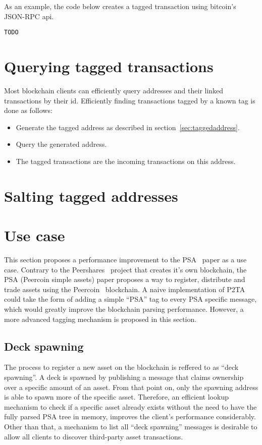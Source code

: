 \documentclass[a4paper,10pt]{article}
\begin{document}
As an example, the code below creates a tagged transaction using bitcoin's JSON-RPC api.
\begin{verbatim}
TODO
\end{verbatim}


\section{Querying tagged transactions}
Most blockchain clients can efficiently query addresses and their linked transactions by their id.
Efficiently finding transactions tagged by a known tag is done as follows:
\begin{itemize}
 \item Generate the tagged address as described in section~\ref{sec:taggedaddress}.
 \item Query the generated address.
 \item The tagged transactions are the incoming transactions on this address.
\end{itemize}


\section{Salting tagged addresses}


\section{Use case}
This section proposes a performance improvement to the PSA~\cite{Pchem} paper as a use case.
Contrary to the Peershares~\cite{TODO} project that creates it's own blockchain, the PSA (Peercoin simple assets) paper proposes a way to register, distribute and trade assets using the Peercoin~\cite{TODO} blockchain.
A naive implementation of P2TA could take the form of adding a simple ``PSA'' tag to every PSA specific message, which would greatly improve the blockchain parsing performance. However, a more advanced tagging mechanism is proposed in this section.

\subsection{Deck spawning}
The process to register a new asset on the blockchain is reffered to as ``deck spawning''. A deck is spawned by publishing a message that claims ownership over a specific amount of an asset. From that point on, only the spawning address is able to spawn more of the specific asset. Therefore, an efficient lookup mechanism to check if a specific asset already exists without the need to have the fully parsed PSA tree in memory, improves the client's performance considerably. Other than that, a mechanism to list all ``deck spawning'' messages is desirable to allow all clients to discover third-party asset transactions.
\end{document}
